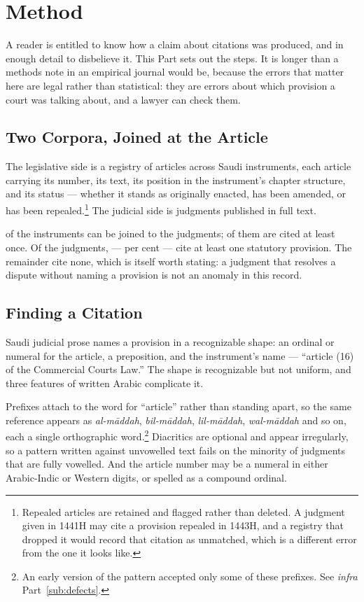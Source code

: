 \documentclass[12pt]{article}
\begin{document}
\section{Method}
\label{sec:method}

A reader is entitled to know how a claim about \nCitations{} citations was
produced, and in enough detail to disbelieve it. This Part sets out the
steps. It is longer than a methods note in an empirical journal would be,
because the errors that matter here are legal rather than statistical: they
are errors about which provision a court was talking about, and a lawyer can
check them.

\subsection{Two Corpora, Joined at the Article}

The legislative side is a registry of \nRegistryArticles{} articles across
\nInstruments{} Saudi instruments, each article carrying its number, its text,
its position in the instrument's chapter structure, and its status --- whether
it stands as originally enacted, has been amended, or has been
repealed.\footnote{Repealed articles are retained and flagged rather than
deleted. A judgment given in 1441H may cite a provision repealed in 1443H, and
a registry that dropped it would record that citation as unmatched, which is a
different error from the one it looks like.} The judicial side is
\nJudgments{} judgments published in full text.

\nJoinInstruments{} of the instruments can be joined to the judgments;
\nInstrumentsCited{} of them are cited at least once. Of the judgments,
\nJudgmentsCiting{} --- \nJudgmentsCitingShare{} per cent --- cite at least one
statutory provision. The remainder cite none, which is itself worth stating: a
judgment that resolves a dispute without naming a provision is not an
anomaly in this record.

\subsection{Finding a Citation}

Saudi judicial prose names a provision in a recognizable shape: an ordinal or
numeral for the article, a preposition, and the instrument's name --- ``article
(16) of the Commercial Courts Law.'' The shape is recognizable but not
uniform, and three features of written Arabic complicate it.

Prefixes attach to the word for ``article'' rather than standing apart, so the
same reference appears as \emph{al-m\=addah}, \emph{bil-m\=addah},
\emph{lil-m\=addah}, \emph{wal-m\=addah} and so on, each a single orthographic
word.\footnote{An early version of the pattern accepted only some of these
prefixes. See \emph{infra} Part~\ref{sub:defects}.} Diacritics are optional and appear
irregularly, so a pattern written against unvowelled text fails on the
minority of judgments that are fully vowelled. And the article number may be a
numeral in either Arabic-Indic or Western digits, or spelled as a compound
ordinal.
\end{document}
